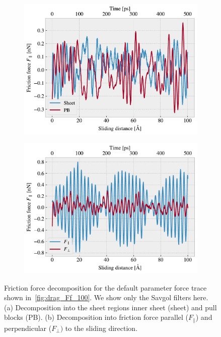 \begin{figure}[!htb]
  \centering
  \begin{subfigure}[t]{0.49\textwidth}
    \centering
    \includegraphics[width=\textwidth]{figures/baseline/decomp_group.pdf}
    \caption{}
    \label{fig:decomp_group}
  \end{subfigure}
  \hfill
  \begin{subfigure}[t]{0.49\textwidth}
      \centering
      \includegraphics[width=\textwidth]{figures/baseline/decomp_direc.pdf}
      \caption{}
      \label{fig:decomp_direc}
  \end{subfigure}
  \caption{Friction force decomposition for the default parameter force trace shown in~\cref{fig:drag_Ff_100}. We show only the Savgol filters here. (a) Decomposition into the sheet regions inner sheet (sheet) and pull blocks (PB). (b) Decomposition into friction force parallel ($F_{\parallel}$) and perpendicular ($F_{\perp})$ to the sliding direction.}
  \label{fig:decomp}
\end{figure}


